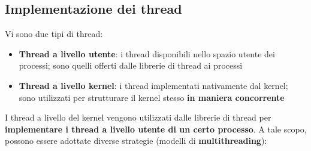 \documentclass[12pt]{article}
\begin{document}
\subsection{Implementazione dei thread}
Vi sono due tipi di thread:
\begin{itemize}
    \item \textbf{Thread a livello utente}: i thread disponibili nello spazio utente dei processi; sono quelli offerti dalle librerie di thread ai processi
    \item \textbf{Thread a livello kernel}: i thread implementati nativamente dal kernel; sono utilizzati per strutturare il kernel stesso \textbf{in maniera concorrente}
\end{itemize}
I thread a livello del kernel vengono utilizzati dalle librerie di thread per \textbf{implementare i thread a livello utente di un certo processo}.
A tale scopo, possono essere adottate diverse strategie (modelli di \textbf{multithreading}):
\end{document}
